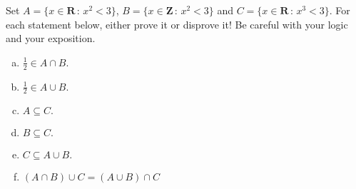 \documentclass[10pt]{article}
\newcommand{\R}{\mathbf{R}}
\newcommand{\Z}{\mathbf{Z}}
\begin{document}
\medskip{} Set $A=\{x\in\R\,:\,x^2<3\}$, $B=\{x\in\Z\,:\,x^2<3\}$ and $C=\{x\in\R\,:\,x^3<3\}$. For each statement below, either prove it or disprove it! Be careful with your logic and your exposition.
\begin{multicols}{2}
\begin{enumerate}[(a)]
\item $\frac{1}{2}\in A\cap B.$
\item $\frac{1}{2}\in A\cup B.$
\item $A\subseteq C.$
\item $B\subseteq C.$
\item $C\subseteq A\cup B.$
\item $(A\cap B)\cup C=(A\cup B)\cap C$
\end{enumerate}
\end{multicols}
\end{document}
